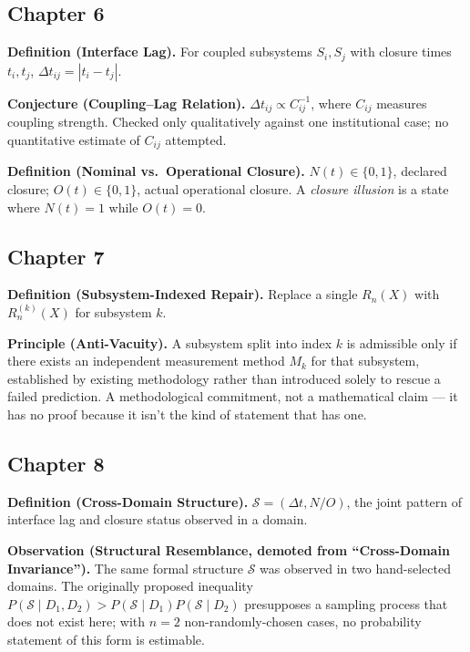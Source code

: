 \subsection*{Chapter 6}

\textbf{Definition (Interface Lag).} For coupled subsystems $S_i, S_j$ with closure times $t_i, t_j$, $\Delta t_{ij} = |t_i - t_j|$.

\textbf{Conjecture (Coupling--Lag Relation).} $\Delta t_{ij} \propto C_{ij}^{-1}$, where $C_{ij}$ measures coupling strength. Checked only qualitatively against one institutional case; no quantitative estimate of $C_{ij}$ attempted.

\textbf{Definition (Nominal vs.\ Operational Closure).} $N(t) \in \{0,1\}$, declared closure; $O(t) \in \{0,1\}$, actual operational closure. A \emph{closure illusion} is a state where $N(t)=1$ while $O(t)=0$.

\subsection*{Chapter 7}

\textbf{Definition (Subsystem-Indexed Repair).} Replace a single $R_n(X)$ with $R_n^{(k)}(X)$ for subsystem $k$.

\textbf{Principle (Anti-Vacuity).} A subsystem split into index $k$ is admissible only if there exists an independent measurement method $M_k$ for that subsystem, established by existing methodology rather than introduced solely to rescue a failed prediction. A methodological commitment, not a mathematical claim --- it has no proof because it isn't the kind of statement that has one.

\subsection*{Chapter 8}

\textbf{Definition (Cross-Domain Structure).} $\mathcal{S} = (\Delta t, N/O)$, the joint pattern of interface lag and closure status observed in a domain.

\textbf{Observation (Structural Resemblance, demoted from ``Cross-Domain Invariance'').} The same formal structure $\mathcal{S}$ was observed in two hand-selected domains. The originally proposed inequality $P(\mathcal{S}\mid D_1,D_2) > P(\mathcal{S}\mid D_1)P(\mathcal{S}\mid D_2)$ presupposes a sampling process that does not exist here; with $n=2$ non-randomly-chosen cases, no probability statement of this form is estimable.

